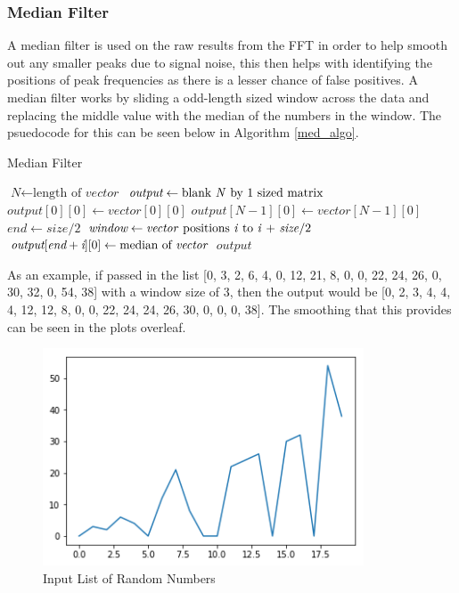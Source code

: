\documentclass[12pt]{report}
\begin{document}
\subsubsection*{Median Filter}
A median filter is used on the raw results from the FFT in order to help smooth out any smaller peaks due to signal noise, this then helps with identifying the positions of peak frequencies as there is a lesser chance of false positives. A median filter works by sliding a odd-length sized window across the data and replacing the middle value with the median of the numbers in the window. The psuedocode for this can be seen below in Algorithm \ref{med_algo}.

\begin{algorithm}
\caption{Median Filter}\label{med_algo}
\begin{algorithmic}[3]

\State $\textit{N} \gets \text{length of }\textit{vector}$
\State $\textit{output} \gets \text{blank \textit{N} by 1 sized matrix}$
\State $\textit{output}[0][0] \gets \textit{vector}[0][0]$
\State $\textit{output}[N-1][0] \gets \textit{vector}[N-1][0]$
\State $\textit{end} \gets \textit{size}/2$
    \State $\textit{window} \gets \text{\textit{vector} positions \textit{i}  to \textit{i}  + \textit{size}}/2$
    \State $\textit{output}[\textit{end}+\textit{i}][0] \gets \text{median of \textit{vector}}$
\EndFor
\Return $\textit{output}$
\EndProcedure
\end{algorithmic}
\end{algorithm}

As an example, if passed in the list [0, 3, 2, 6, 4, 0, 12, 21, 8, 0, 0, 22, 24, 26, 0, 30, 32, 0, 54, 38] with a window size of 3, then the output would be [0, 2, 3, 4, 4, 4, 12, 12, 8, 0, 0, 22, 24, 24, 26, 30, 0, 0, 0, 38]. The smoothing that this provides can be seen in the plots overleaf.

\begin{figure}[H]
	\centering
    \includegraphics[width=0.85\textwidth]{med_graph_in.png}
	\caption{Input List of Random Numbers}\label{med_graph_in}
	\centering
\end{figure}
\end{document}
